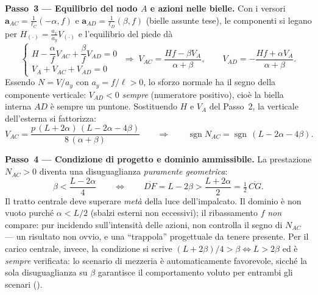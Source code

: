 \begin{esercizio}
	\medskip\noindent\textbf{Passo~3 --- Equilibrio del nodo $A$ e azioni nelle bielle.}
	Con i versori $\mathbf a_{AC}=\tfrac1{\ell_C}(-\alpha,f)$ e $\mathbf a_{AD}=\tfrac1{\ell_D}(\beta,f)$
	(bielle assunte tese), le componenti si legano per $H_{(\cdot)}=\tfrac{a_x}{a_y}V_{(\cdot)}$ e l'equilibrio
	del piede dà
	\[
	\begin{cases} H-\dfrac{\alpha}{f}V_{AC}+\dfrac{\beta}{f}V_{AD}=0\\[6pt] V_A+V_{AC}+V_{AD}=0\end{cases}
	\;\Longrightarrow\;
	V_{AC}=\frac{Hf-\beta V_A}{\alpha+\beta},\qquad V_{AD}=-\frac{Hf+\alpha V_A}{\alpha+\beta}.
	\]
	Essendo $N=V/a_y$ con $a_y=f/\ell>0$, lo sforzo normale ha il segno della componente verticale: $V_{AD}<0$
	\emph{sempre} (numeratore positivo), cioè la biella interna $AD$ è sempre un puntone. Sostituendo
	$H$ e $V_A$ del Passo~2, la verticale dell'esterna si fattorizza:
	\[
	V_{AC}=\frac{p\,(L+2\alpha)\,(L-2\alpha-4\beta)}{8\,(\alpha+\beta)}
	\qquad\Longrightarrow\qquad \operatorname{sgn}N_{AC}=\operatorname{sgn}\,(L-2\alpha-4\beta).
	\]
	
	\medskip\noindent\textbf{Passo~4 --- Condizione di progetto e dominio ammissibile.}
	La prestazione $N_{AC}>0$ diventa una disuguaglianza \emph{puramente geometrica}:
	\[
	\beta<\frac{L-2\alpha}{4}\qquad\Longleftrightarrow\qquad \overline{DF}=L-2\beta>\frac{L+2\alpha}{2}=\tfrac12\,\overline{CG}.
	\]
	Il tratto centrale deve superare \emph{metà} della luce dell'impalcato. Il dominio è non vuoto purché
	$\alpha<L/2$ (sbalzi esterni non eccessivi); il ribassamento $f$ \emph{non} compare: pur incidendo
	sull'intensità delle azioni, non controlla il segno di $N_{AC}$ --- un risultato non ovvio, e una
	``trappola'' progettuale da tenere presente. Per il carico centrale, invece, la condizione si scrive
	$(L+2\beta)/4>\beta\Leftrightarrow L>2\beta$ ed è \emph{sempre} verificata: lo scenario di mezzeria è
	automaticamente favorevole, sicché la sola disuguaglianza su $\beta$ garantisce il comportamento voluto
	per entrambi gli scenari ().
	




\end{esercizio}
